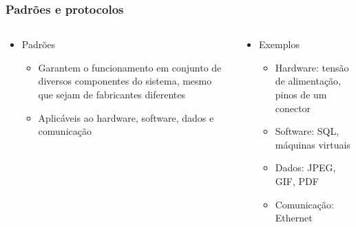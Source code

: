 \documentclass[aspectratio=169,
				xcolor=table]{beamer}
\begin{document}
	\begin{frame}
		\frametitle{Padrões e protocolos}
		\begin{columns}
			\begin{column}{0.63\textwidth}
				\begin{itemize}
					\item Padrões
					\begin{itemize}
						\item Garantem o funcionamento em conjunto de diversos componentes do sistema, mesmo que sejam de fabricantes diferentes
						\item Aplicáveis ao hardware, software, dados e comunicação
		
					\end{itemize}
				\end{itemize}

			\end{column}
			\begin{column}{0.37\textwidth}
			\begin{itemize}
				\item Exemplos
				\begin{itemize}
					\item Hardware:  tensão de alimentação, pinos de um conector
					\item Software: SQL, máquinas virtuais
					\item Dados: JPEG, GIF, PDF
					\item Comunicação: Ethernet

				\end{itemize}
			\end{itemize}
			\end{column}
		\end{columns}
	\end{frame}	
\end{document}
